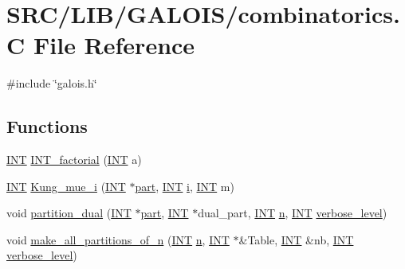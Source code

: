 \hypertarget{combinatorics_8_c}{}\section{S\+R\+C/\+L\+I\+B/\+G\+A\+L\+O\+I\+S/combinatorics.C File Reference}
\label{combinatorics_8_c}
{\ttfamily \#include \char`\"{}galois.\+h\char`\"{}}\newline
\subsection*{Functions}
\begin{DoxyCompactItemize}
\item 
\mbox{\hyperlink{galois_8h_a09fddde158a3a20bd2dcadb609de11dc}{I\+NT}} \mbox{\hyperlink{combinatorics_8_c_a228d7270584751e8bcdd0980b89948c7}{I\+N\+T\+\_\+factorial}} (\mbox{\hyperlink{galois_8h_a09fddde158a3a20bd2dcadb609de11dc}{I\+NT}} a)
\item 
\mbox{\hyperlink{galois_8h_a09fddde158a3a20bd2dcadb609de11dc}{I\+NT}} \mbox{\hyperlink{combinatorics_8_c_a4ed0c58d51058d4d6d5d0d09e832de27}{Kung\+\_\+mue\+\_\+i}} (\mbox{\hyperlink{galois_8h_a09fddde158a3a20bd2dcadb609de11dc}{I\+NT}} $\ast$\mbox{\hyperlink{tdo__refine__all_8_c_af32a7ef139fc39ca4f560f3a90a83b89}{part}}, \mbox{\hyperlink{galois_8h_a09fddde158a3a20bd2dcadb609de11dc}{I\+NT}} \mbox{\hyperlink{alphabet2_8_c_acb559820d9ca11295b4500f179ef6392}{i}}, \mbox{\hyperlink{galois_8h_a09fddde158a3a20bd2dcadb609de11dc}{I\+NT}} m)
\item 
void \mbox{\hyperlink{combinatorics_8_c_a4353faa761b601cd21a5843c6ff2a35e}{partition\+\_\+dual}} (\mbox{\hyperlink{galois_8h_a09fddde158a3a20bd2dcadb609de11dc}{I\+NT}} $\ast$\mbox{\hyperlink{tdo__refine__all_8_c_af32a7ef139fc39ca4f560f3a90a83b89}{part}}, \mbox{\hyperlink{galois_8h_a09fddde158a3a20bd2dcadb609de11dc}{I\+NT}} $\ast$dual\+\_\+part, \mbox{\hyperlink{galois_8h_a09fddde158a3a20bd2dcadb609de11dc}{I\+NT}} \mbox{\hyperlink{simeon_8_c_a7f2cd26777ce0ff3fdaf8d02aacbddfb}{n}}, \mbox{\hyperlink{galois_8h_a09fddde158a3a20bd2dcadb609de11dc}{I\+NT}} \mbox{\hyperlink{simeon_8_c_a818073fbcc2f439e7c56952f67386122}{verbose\+\_\+level}})
\item 
void \mbox{\hyperlink{combinatorics_8_c_ac004d49af3c23fab0e76532f131d1663}{make\+\_\+all\+\_\+partitions\+\_\+of\+\_\+n}} (\mbox{\hyperlink{galois_8h_a09fddde158a3a20bd2dcadb609de11dc}{I\+NT}} \mbox{\hyperlink{simeon_8_c_a7f2cd26777ce0ff3fdaf8d02aacbddfb}{n}}, \mbox{\hyperlink{galois_8h_a09fddde158a3a20bd2dcadb609de11dc}{I\+NT}} $\ast$\&Table, \mbox{\hyperlink{galois_8h_a09fddde158a3a20bd2dcadb609de11dc}{I\+NT}} \&nb, \mbox{\hyperlink{galois_8h_a09fddde158a3a20bd2dcadb609de11dc}{I\+NT}} \mbox{\hyperlink{simeon_8_c_a818073fbcc2f439e7c56952f67386122}{verbose\+\_\+level}})

\end{DoxyCompactItemize}
